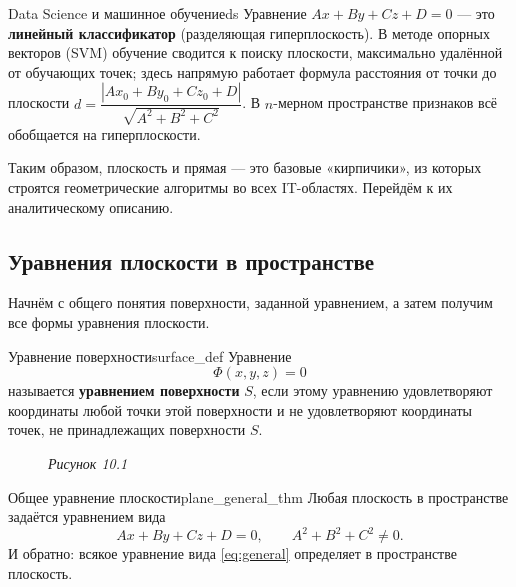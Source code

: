 \documentclass[12pt,a4paper]{article}
\begin{document}
\begin{remarkIT}{Data Science и машинное обучение}{ds}
  Уравнение $Ax + By + Cz + D = 0$ --- это \textbf{линейный
  классификатор} (разделяющая гиперплоскость). В методе опорных
  векторов (SVM) обучение сводится к поиску плоскости, максимально
  удалённой от обучающих точек; здесь напрямую работает формула
  расстояния от точки до плоскости
  $d = \dfrac{|Ax_0 + By_0 + Cz_0 + D|}{\sqrt{A^2+B^2+C^2}}$.
  В $n$-мерном пространстве признаков всё обобщается на гиперплоскости.
\end{remarkIT}

Таким образом, плоскость и прямая --- это базовые «кирпичики», из
которых строятся геометрические алгоритмы во всех IT-областях. Перейдём
к их аналитическому описанию.

\subsection*{Уравнения плоскости в пространстве}

Начнём с общего понятия поверхности, заданной уравнением, а затем
получим все формы уравнения плоскости.

\begin{definition}{Уравнение поверхности}{surface_def}
  Уравнение
  \[
    \Phi(x, y, z) = 0
  \]
  называется \textbf{уравнением поверхности} $S$, если этому уравнению
  удовлетворяют координаты любой точки этой поверхности и не
  удовлетворяют координаты точек, не принадлежащих поверхности $S$.
\end{definition}

\begin{figure}[h!]
  \centering

  \smallskip
  \textit{Рисунок 10.1}
\end{figure}

\begin{theorem}{Общее уравнение плоскости}{plane_general_thm}
  Любая плоскость в пространстве задаётся уравнением вида
  \begin{equation}
    Ax + By + Cz + D = 0, \qquad A^2+B^2+C^2 \neq 0.
    \tag{10.1}\label{eq:general}
  \end{equation}
  И обратно: всякое уравнение вида \eqref{eq:general} определяет в
  пространстве плоскость.
\end{theorem}
\end{document}
